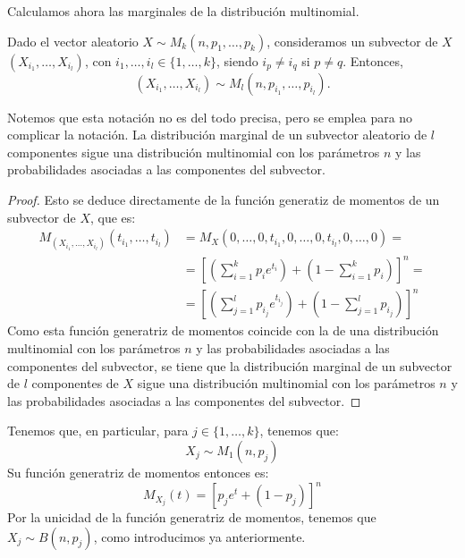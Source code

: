 Calculamos ahora las marginales de la distribución multinomial.
\begin{prop}
    Dado el vector aleatorio $X\sim M_k(n, p_1, \ldots, p_k)$, consideramos un subvector de $X$ $(X_{i_1}, \ldots, X_{i_l})$, con $i_1, \ldots, i_l\in \{1, \ldots, k\}$, siendo $i_p\neq i_q$ si $p\neq q$. Entonces,
    $$(X_{i_1}, \ldots, X_{i_l})\sim M_l(n, p_{i_1}, \ldots, p_{i_l}).$$
\end{prop}
\begin{observacion}
    Notemos que esta notación no es del todo precisa, pero se emplea para no complicar la notación. La distribución marginal de un subvector aleatorio de $l$ componentes sigue una distribución multinomial con los parámetros $n$ y las probabilidades asociadas a las componentes del subvector.
\end{observacion}
\begin{proof}
    Esto se deduce directamente de la función generatiz de momentos de un subvector de $X$, que es:
    \begin{align*}
        M_{(X_{i_1}, \ldots, X_{i_l})}(t_{i_1}, \ldots, t_{i_l})&=M_X(0,\dots,0,t_{i_1},0,\dots,0,t_{i_l},0,\dots,0)
        =\\&=
        \left[\left(\sum_{i=1}^k p_i e^{t_i}\right)+\left(1-\sum_{i=1}^k p_i\right)\right]^n
        =\\&=
        \left[\left(\sum_{j=1}^l p_{i_j} e^{t_{i_j}}\right)+\left(1-\sum_{j=1}^l p_{i_j}\right)\right]^n
    \end{align*}
    Como esta función generatriz de momentos coincide con la de una distribución multinomial con los parámetros $n$ y las probabilidades asociadas a las componentes del subvector, se tiene que la distribución marginal de un subvector de $l$ componentes de $X$ sigue una distribución multinomial con los parámetros $n$ y las probabilidades asociadas a las componentes del subvector.
\end{proof}

Tenemos que, en particular, para $j\in \{1,\dots,k\}$, tenemos que:
\begin{equation*}
    X_j\sim M_1(n, p_j)
\end{equation*}
Su función generatriz de momentos entonces es:
\begin{equation*}
    M_{X_j}(t)=\left[p_j e^t+(1-p_j)\right]^n
\end{equation*}
Por la unicidad de la función generatriz de momentos, tenemos que $X_j\sim B(n, p_j)$, como introducimos ya anteriormente.\\

